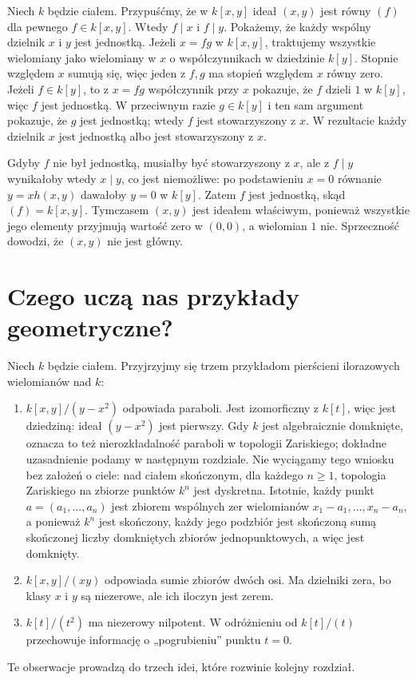 \begin{przyklad}
Niech $k$ będzie ciałem. Przypuśćmy, że w $k[x,y]$ ideał $(x,y)$ jest równy $(f)$
dla pewnego $f\in k[x,y]$. Wtedy $f\mid x$ i $f\mid y$.
Pokażemy, że każdy wspólny dzielnik $x$ i $y$ jest jednostką.
Jeżeli $x=fg$ w $k[x,y]$, traktujemy wszystkie wielomiany
jako wielomiany w $x$ o współczynnikach w dziedzinie $k[y]$.
Stopnie względem $x$ sumują się, więc jeden z $f,g$ ma stopień
względem $x$ równy zero. Jeżeli $f\in k[y]$, to z $x=fg$
współczynnik przy $x$ pokazuje, że $f$ dzieli $1$ w $k[y]$,
więc $f$ jest jednostką. W przeciwnym razie $g\in k[y]$
i ten sam argument pokazuje, że $g$ jest jednostką;
wtedy $f$ jest stowarzyszony z $x$.
W rezultacie każdy dzielnik $x$ jest jednostką albo jest
stowarzyszony z $x$.

Gdyby $f$ nie był jednostką, musiałby być stowarzyszony z $x$,
ale z $f\mid y$ wynikałoby wtedy $x\mid y$, co jest niemożliwe:
po podstawieniu $x=0$ równanie $y=xh(x,y)$ dawałoby $y=0$
w $k[y]$. Zatem $f$ jest jednostką, skąd $(f)=k[x,y]$.
Tymczasem $(x,y)$ jest ideałem właściwym, ponieważ
wszystkie jego elementy przyjmują wartość zero w $(0,0)$,
a wielomian $1$ nie. Sprzeczność dowodzi, że $(x,y)$ nie jest główny.
\end{przyklad}

\section{Czego uczą nas przykłady geometryczne?}

Niech $k$ będzie ciałem. Przyjrzyjmy się trzem przykładom
pierścieni ilorazowych wielomianów nad $k$:
\begin{enumerate}[label=\arabic*)]
\item $k[x,y]/(y-x^2)$ odpowiada paraboli. Jest izomorficzny z $k[t]$,
więc jest dziedziną: ideał $(y-x^2)$ jest pierwszy.
Gdy $k$ jest algebraicznie domknięte, oznacza to też
nierozkładalność paraboli w topologii Zariskiego; dokładne uzasadnienie
podamy w następnym rozdziale. Nie wyciągamy tego wniosku bez założeń
o ciele: nad ciałem skończonym, dla każdego $n\ge1$,
topologia Zariskiego na zbiorze punktów $k^n$ jest dyskretna. Istotnie, każdy punkt
$a=(a_1,\dots,a_n)$ jest zbiorem wspólnych zer
wielomianów $x_1-a_1,\dots,x_n-a_n$, a ponieważ
$k^n$ jest skończony, każdy jego podzbiór jest skończoną
sumą skończonej liczby domkniętych zbiorów jednopunktowych,
a więc jest domknięty.
\item $k[x,y]/(xy)$ odpowiada sumie zbiorów dwóch osi. Ma dzielniki zera,
bo klasy $x$ i $y$ są niezerowe, ale ich iloczyn jest zerem.
\item $k[t]/(t^2)$ ma niezerowy nilpotent. W odróżnieniu od
$k[t]/(t)$ przechowuje informację o „pogrubieniu” punktu $t=0$.
\end{enumerate}
Te obserwacje prowadzą do trzech idei, które rozwinie kolejny rozdział.

